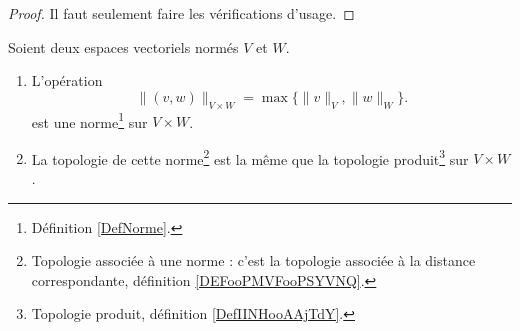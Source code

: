 \begin{proof}
	Il faut seulement faire les vérifications d'usage.
\end{proof}

\begin{lemmaDef}        \label{LEMooFQMSooLmdIvD}
	Soient deux espaces vectoriels normés \( V\) et \( W\).
	\begin{enumerate}
		\item
		      L'opération
		      \begin{equation}	\label{EqNormeVxWmax}
			      \|(v,w) \|_{V\times W}=\max\{\|v\|_{V},\|w\|_W\}.
		      \end{equation}
		      est une norme\footnote{Définition \ref{DefNorme}.} sur \( V\times W\).
		\item
		      La topologie de cette norme\footnote{Topologie associée à une norme : c'est la topologie associée à la distance correspondante, définition \ref{DEFooPMVFooPSYVNQ}.} est la même que la topologie produit\footnote{Topologie produit, définition \ref{DefIINHooAAjTdY}.} sur \( V\times W\).
	\end{enumerate}
\end{lemmaDef}

